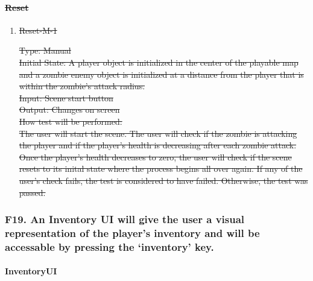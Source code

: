 \documentclass[12pt, titlepage]{article}
\DeclareRobustCommand{\hsout}[1]{\texorpdfstring{\sout{#1}}{#1}}
\begin{document}
\paragraph{\hsout{Reset}}

\begin{enumerate}

\item{\sout{Reset-M-1}\\}

\sout{Type: Manual} \\
					
\sout{Initial State: A player object is initialized in the center of the playable map and a zombie enemy object is initialized at a distance from the player that is within the zombie's attack radius.}\\
					
\sout{Input: Scene start button} \\
					
\sout{Output: Changes on screen} \\
					
\sout{How test will be performed:}\\  \sout{The user will start the scene. The user will check if the zombie is attacking the player and if the player's health is decreasing after each zombie attack. Once the player's health decreases to zero, the user will check if the scene resets to its inital state where the process begins all over again. If any of the user's check fails, the test is considered to have failed. Otherwise, the test was passed.} \\

\end{enumerate}

\subsubsection{{\color{magenta} F19. An Inventory UI will give the user a visual representation of the player's inventory and will be accessable by pressing the ‘inventory’ key.}} 

\paragraph{{\color{magenta} InventoryUI}}
\end{document}
